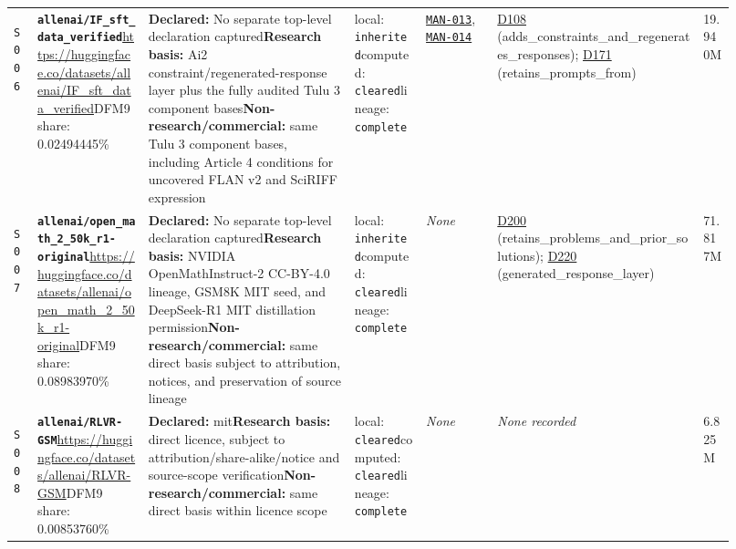 \documentclass[9pt,a4paper]{article}
\newcommand{\srcid}[1]{\hypertarget{src:#1}{\texttt{#1}}}
\begin{document}
\begin{landscape}
\begin{longtable}{@{}L{0.03\linewidth}L{0.14\linewidth}L{0.26\linewidth}L{0.09\linewidth}L{0.09\linewidth}L{0.265\linewidth}L{0.045\linewidth}@{}}
\srcid{S006} & \textbf{\nolinkurl{allenai/IF_sft_data_verified}}\newline \url{https://huggingface.co/datasets/allenai/IF_sft_data_verified}\newline DFM9 share: 0.02494445\% & \textbf{Declared:} No separate top-level declaration captured\newline \textbf{Research basis:} Ai2 constraint/regenerated-response layer plus the fully audited Tulu 3 component bases\newline \textbf{Non-research/commercial:} same Tulu 3 component bases, including Article 4 conditions for uncovered FLAN v2 and SciRIFF expression & local: \texttt{inherited}\newline computed: \texttt{cleared}\newline lineage: \texttt{complete} & \hyperlink{manual:MAN-013}{\texttt{MAN-013}}, \hyperlink{manual:MAN-014}{\texttt{MAN-014}} & \hyperlink{dep:D108}{D108} (adds\_constraints\_and\_regenerates\_responses); \hyperlink{dep:D171}{D171} (retains\_prompts\_from) & 19.940M \\
\srcid{S007} & \textbf{\nolinkurl{allenai/open_math_2_50k_r1-original}}\newline \url{https://huggingface.co/datasets/allenai/open_math_2_50k_r1-original}\newline DFM9 share: 0.08983970\% & \textbf{Declared:} No separate top-level declaration captured\newline \textbf{Research basis:} NVIDIA OpenMathInstruct-2 CC-BY-4.0 lineage, GSM8K MIT seed, and DeepSeek-R1 MIT distillation permission\newline \textbf{Non-research/commercial:} same direct basis subject to attribution, notices, and preservation of source lineage & local: \texttt{inherited}\newline computed: \texttt{cleared}\newline lineage: \texttt{complete} & \textit{None} & \hyperlink{dep:D200}{D200} (retains\_problems\_and\_prior\_solutions); \hyperlink{dep:D220}{D220} (generated\_response\_layer) & 71.817M \\
\srcid{S008} & \textbf{\nolinkurl{allenai/RLVR-GSM}}\newline \url{https://huggingface.co/datasets/allenai/RLVR-GSM}\newline DFM9 share: 0.00853760\% & \textbf{Declared:} mit\newline \textbf{Research basis:} direct licence, subject to attribution/share-alike/notice and source-scope verification\newline \textbf{Non-research/commercial:} same direct basis within licence scope & local: \texttt{cleared}\newline computed: \texttt{cleared}\newline lineage: \texttt{complete} & \textit{None} & \textit{None recorded} & 6.825M \\

\end{longtable}
\end{landscape}
\end{document}

